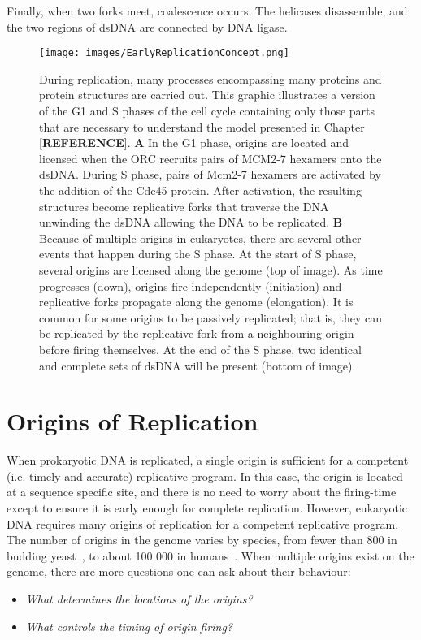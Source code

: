 		Finally, when two forks meet, coalescence occurs:
		The helicases disassemble, and the two regions of dsDNA are connected by DNA ligase.~\cite{MolecularCellBiology}
	
	\begin{figure}[tbh]
		\begin{center}
			\texttt{[image: images/EarlyReplicationConcept.png]}
		\end{center}
			\caption[Events During Replication]{\label{fig:EarlyReplicationConcept} During replication, many processes encompassing many proteins and protein structures are carried out.
				This graphic illustrates a version of the G1 and S phases of the cell cycle containing only those parts that are necessary to understand the model presented in Chapter [\textbf{REFERENCE}].
				\textbf{A} In the G1 phase, origins are located and licensed when the ORC recruits pairs of MCM2-7 hexamers onto the dsDNA.
					During S phase, pairs of Mcm2-7 hexamers are activated by the addition of the Cdc45 protein.
					After activation, the resulting structures become replicative forks that traverse the DNA unwinding the dsDNA allowing the DNA to be replicated.
				\textbf{B} Because of multiple origins in eukaryotes, there are several other events that happen during the S phase.
					At the start of S phase, several origins are licensed along the genome (top of image).
					As time progresses (down), origins fire independently (initiation) and replicative forks propagate along the genome (elongation).
					It is common for some origins to be passively replicated; that is, they can be replicated by the replicative fork from a neighbouring origin before firing themselves.
					At the end of the S phase, two identical and complete sets of dsDNA will be present (bottom of image).}
	\end{figure}
	
	
	\section{Origins of Replication}
	\label{sec:Origins}
	
	When prokaryotic DNA is replicated, a single origin is sufficient for a competent (i.e. timely and accurate) replicative program.
	In this case, the origin is located at a sequence specific site, and there is no need to worry about the firing-time except to ensure it is early enough for complete replication.
	However, eukaryotic DNA requires many origins of replication for a competent replicative program.
	The number of origins in the genome varies by species, from fewer than 800 in budding yeast~\cite{OriDB}, to about 100 000 in humans~\cite{OriginsReview}.
	When multiple origins exist on the genome, there are more questions one can ask about their behaviour:
	\begin{itemize}
		\item \emph{What determines the locations of the origins?}
		\item \emph{What controls the timing of origin firing?}
	\end{itemize}
	
